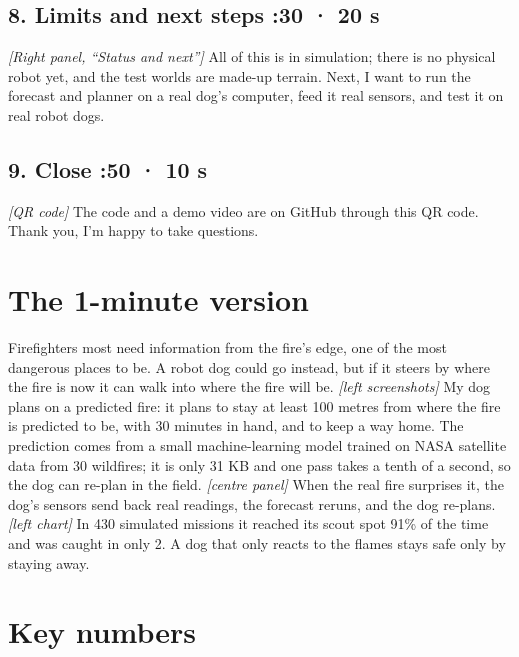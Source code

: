 \documentclass[11pt]{article}
\newcommand{\cue}[1]{{\color{cue}\itshape [#1]}}
\newcommand{\talkpart}[2]{\subsection{#1 \hfill {\normalsize\color{cue}\mdseries #2}}}
\begin{document}
\talkpart{8. Limits and next steps}{4:30 · 20 s}
\cue{Right panel, ``Status and next''}
All of this is in simulation; there is no physical robot yet, and the test worlds are made-up terrain. Next, I want to run the forecast and planner on a real dog's computer, feed it real sensors, and test it on real robot dogs.

\talkpart{9. Close}{4:50 · 10 s}
\cue{QR code}
The code and a demo video are on GitHub through this QR code. Thank you, I'm happy to take questions.

\section{The 1-minute version}

Firefighters most need information from the fire's edge, one of the most dangerous places to be. A robot dog could go instead, but if it steers by where the fire is now it can walk into where the fire will be.
\cue{left screenshots} My dog plans on a predicted fire: it plans to stay at least 100 metres from where the fire is predicted to be, with 30 minutes in hand, and to keep a way home.
The prediction comes from a small machine-learning model trained on NASA satellite data from 30 wildfires; it is only 31 KB and one pass takes a tenth of a second, so the dog can re-plan in the field.
\cue{centre panel} When the real fire surprises it, the dog's sensors send back real readings, the forecast reruns, and the dog re-plans.
\cue{left chart} In 430 simulated missions it reached its scout spot 91\% of the time and was caught in only 2. A dog that only reacts to the flames stays safe only by staying away.

\section{Key numbers}
\end{document}
